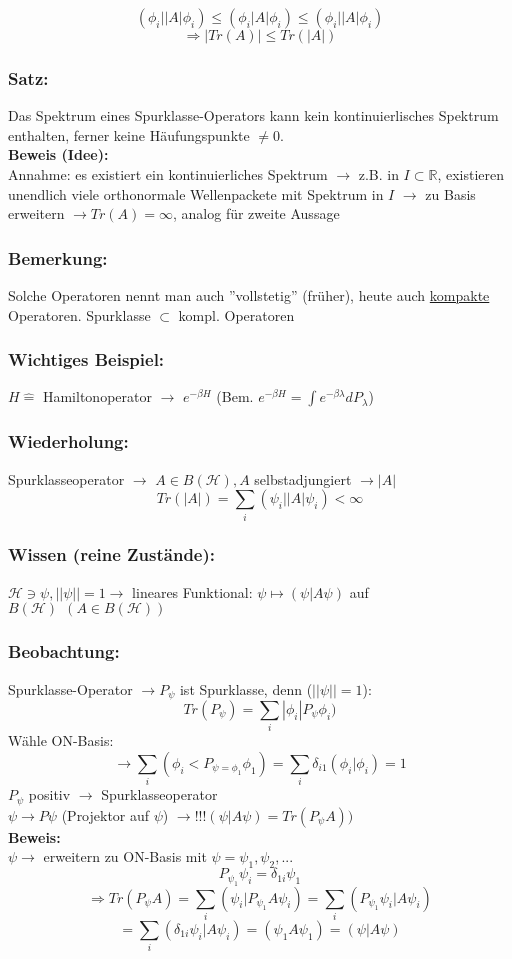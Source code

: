 \documentclass[twoside,a4paper]{scrartcl}
\newcommand{\R}{\mathbb{R}}
\renewcommand{\1}{\mathds{1}}
\newcommand{\Ra}{\Rightarrow}
\newcommand{\ra}{\rightarrow}
\renewcommand{\l}{\lambda}
\renewcommand{\H}{\mathcal{H}}
\renewcommand{\R}{\mathbb{R}}
\begin{document}
$$(\phi_i| |A| \phi_i) \leq (\phi_i|A|\phi_i)\leq (\phi_i ||A| \phi_i)$$
$$\Ra |Tr(A)| \leq Tr(|A|)$$

\subsubsection*{Satz:}
Das Spektrum eines Spurklasse-Operators kann kein kontinuierlisches Spektrum enthalten, ferner keine Häufungspunkte $\neq 0$.\\
\textbf{Beweis (Idee):}\\
Annahme: es existiert ein kontinuierliches Spektrum $\ra$ z.B. in $I \subset \R$, existieren unendlich viele orthonormale Wellenpackete mit Spektrum in $I$ $\ra$ zu Basis erweitern $\ra Tr(A)=\infty$, analog für zweite Aussage
\subsubsection*{Bemerkung:}
Solche Operatoren nennt man auch ''vollstetig'' (früher), heute auch \underline{kompakte} Operatoren. Spurklasse $\subset$ kompl. Operatoren

\subsubsection*{Wichtiges Beispiel:}
$H \mathrel{\widehat{=}} $ Hamiltonoperator $\ra$ $e^{-\beta H}$ (Bem. $e^{-\beta H}=\int e^{-\beta \l}dP_\l$)


\subsubsection*{Wiederholung:}
Spurklasseoperator $\ra$ $A\in B(\H), A $ selbstadjungiert $\ra |A|$\\
$$Tr(|A|)=\sum_i (\psi_i||A|\psi_i)< \infty$$

\subsubsection*{Wissen (reine Zustände):}
$\H \ni \psi, ||\psi||=1 \ra$ lineares Funktional: $ \psi \mapsto (\psi|A\psi)$ auf $B(\H)\ \ (A\in B(\H))$
\subsubsection*{Beobachtung:}
Spurklasse-Operator $\ra P_\psi$ ist Spurklasse, denn ($||\psi||=1$):
$$Tr(P_\psi)=\sum_i |\phi_i|P_\psi \phi_i)$$ 
Wähle ON-Basis:
$$\ra \sum_i (\phi_i<P_{\psi=\phi_1}\phi_1)=\sum_i \delta_{i1} (\phi_i|\phi_i)=1$$
$P_\psi$ positiv $\ra$ Spurklasseoperator \\
$\psi \ra P\psi$ (Projektor auf $\psi$) $\ra !!! (\psi|A\psi)=Tr(P_\psi A))$\\
\textbf{Beweis:}\\
$\psi \ra$ erweitern zu ON-Basis mit $\psi=\psi_1, \psi_2,...$ \\
$$P_{\psi_1}\psi_i=\delta_{1i}\psi_1$$
$$\Ra Tr(P_\psi A)=\sum_i (\psi_i|P_{\psi_1}A\psi_i)=\sum_i (P_{\psi_1}\psi_i|A\psi_i)$$
$$=\sum_i (\delta_{1i}\psi_i|A\psi_i)=(\psi_1A\psi_1)=(\psi|A\psi)$$
\end{document}
